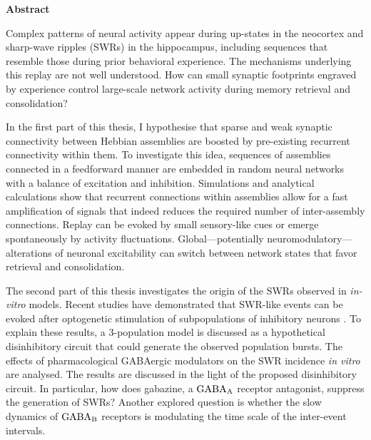 \huge\textbf{Abstract}
\normalsize
\vspace{10mm}


Complex patterns of neural activity appear during up-states in the neocortex
and sharp-wave ripples (SWRs) in the hippocampus, including sequences that
resemble those during prior behavioral experience. The mechanisms underlying
this replay are not well understood. How can small synaptic footprints engraved
by experience control large-scale network activity during memory retrieval and
consolidation?

In the first part of this thesis, I hypothesise that sparse and weak
synaptic connectivity between Hebbian assemblies are boosted by pre-existing
recurrent connectivity within them. To investigate this idea, sequences of
assemblies connected in a feedforward manner are embedded in random neural
networks with a balance of excitation and inhibition. Simulations and
analytical calculations show that recurrent connections within assemblies allow
for a fast amplification of signals that indeed reduces the required number of
inter-assembly connections. Replay can be evoked by small sensory-like cues or
emerge spontaneously by activity fluctuations. Global---potentially
neuromodulatory---alterations of neuronal excitability can switch between
network states that favor retrieval and consolidation.

The second part of this thesis investigates the origin of the SWRs observed in
\textit{in-vitro} models. Recent studies have demonstrated that SWR-like events
can be evoked after optogenetic stimulation of subpopulations of inhibitory
neurons \citep{Schlingloff2014, Kohus2016}. To explain these results, a
3-population model is discussed as a hypothetical disinhibitory circuit that
could generate the observed population bursts. The effects of pharmacological
GABAergic modulators on the SWR incidence \textit{in vitro} are analysed. The
results are discussed in the light of the proposed disinhibitory circuit. In
particular, how does gabazine, a $\rm GABA_A$ receptor antagonist, suppress the
generation of SWRs? Another explored question is whether the slow dynamics of
$\rm GABA_B$ receptors is modulating the time scale of the inter-event
intervals.

\newpage

